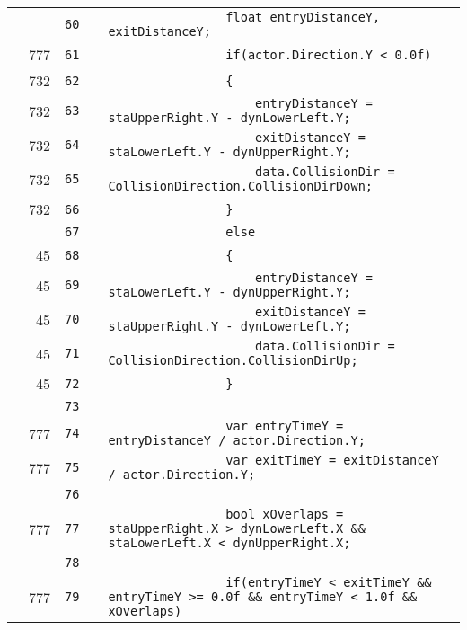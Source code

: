 \documentclass[a4paper,landscape,10pt]{article}
\begin{document}
\begin{longtable}[l]{lrrll}
\cellcolor{gray} &  & \verb~60~ & & \verb~                float entryDistanceY, exitDistanceY;~\\
\cellcolor{green} & 777 & \verb~61~ & & \verb~                if(actor.Direction.Y < 0.0f)~\\
\cellcolor{green} & 732 & \verb~62~ & & \verb~                {~\\
\cellcolor{green} & 732 & \verb~63~ & & \verb~                    entryDistanceY = staUpperRight.Y - dynLowerLeft.Y;~\\
\cellcolor{green} & 732 & \verb~64~ & & \verb~                    exitDistanceY = staLowerLeft.Y - dynUpperRight.Y;~\\
\cellcolor{green} & 732 & \verb~65~ & & \verb~                    data.CollisionDir = CollisionDirection.CollisionDirDown;~\\
\cellcolor{green} & 732 & \verb~66~ & & \verb~                }~\\
\cellcolor{gray} &  & \verb~67~ & & \verb~                else~\\
\cellcolor{green} & 45 & \verb~68~ & & \verb~                {~\\
\cellcolor{green} & 45 & \verb~69~ & & \verb~                    entryDistanceY = staLowerLeft.Y - dynUpperRight.Y;~\\
\cellcolor{green} & 45 & \verb~70~ & & \verb~                    exitDistanceY = staUpperRight.Y - dynLowerLeft.Y;~\\
\cellcolor{green} & 45 & \verb~71~ & & \verb~                    data.CollisionDir = CollisionDirection.CollisionDirUp;~\\
\cellcolor{green} & 45 & \verb~72~ & & \verb~                }~\\
\cellcolor{gray} &  & \verb~73~ & & \verb~~\\
\cellcolor{green} & 777 & \verb~74~ & & \verb~                var entryTimeY = entryDistanceY / actor.Direction.Y;~\\
\cellcolor{green} & 777 & \verb~75~ & & \verb~                var exitTimeY = exitDistanceY / actor.Direction.Y;~\\
\cellcolor{gray} &  & \verb~76~ & & \verb~~\\
\cellcolor{green} & 777 & \verb~77~ & & \verb~                bool xOverlaps = staUpperRight.X > dynLowerLeft.X && staLowerLeft.X < dynUpperRight.X;~\\
\cellcolor{gray} &  & \verb~78~ & & \verb~~\\
\cellcolor{green} & 777 & \verb~79~ & & \verb~                if(entryTimeY < exitTimeY && entryTimeY >= 0.0f && entryTimeY < 1.0f && xOverlaps)~\\

\end{longtable}
\end{document}
